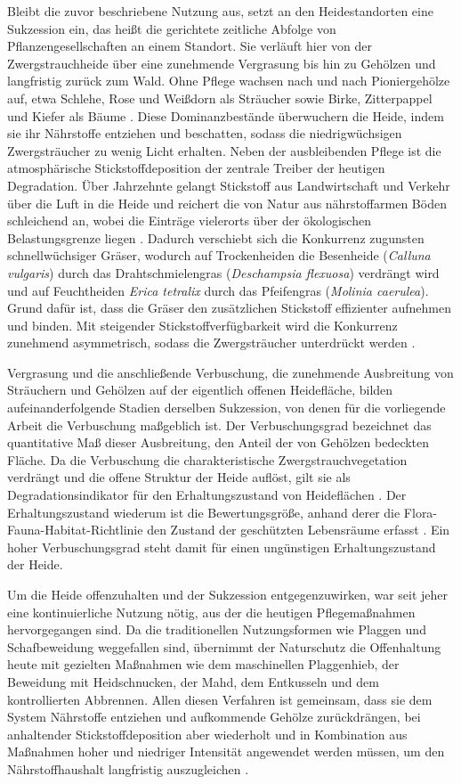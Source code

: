 Bleibt die zuvor beschriebene Nutzung aus, setzt an den Heidestandorten eine Sukzession ein, das heißt die gerichtete zeitliche Abfolge von Pflanzengesellschaften an einem Standort. Sie verläuft hier von der Zwergstrauchheide über eine zunehmende Vergrasung bis hin zu Gehölzen und langfristig zurück zum Wald. Ohne Pflege wachsen nach und nach Pioniergehölze auf, etwa Schlehe, Rose und Weißdorn als Sträucher sowie Birke, Zitterpappel und Kiefer als Bäume \cite{Schoknecht.1998}. Diese Dominanzbestände überwuchern die Heide, indem sie ihr Nährstoffe entziehen und beschatten, sodass die niedrigwüchsigen Zwergsträucher zu wenig Licht erhalten. Neben der ausbleibenden Pflege ist die atmosphärische Stickstoffdeposition der zentrale Treiber der heutigen Degradation. Über Jahrzehnte gelangt Stickstoff aus Landwirtschaft und Verkehr über die Luft in die Heide und reichert die von Natur aus nährstoffarmen Böden schleichend an, wobei die Einträge vielerorts über der ökologischen Belastungsgrenze liegen \cite{Bobbink.2010}. Dadurch verschiebt sich die Konkurrenz zugunsten schnellwüchsiger Gräser, wodurch auf Trockenheiden die Besenheide (\textit{Calluna vulgaris}) durch das Drahtschmielengras (\textit{Deschampsia flexuosa}) verdrängt wird und auf Feuchtheiden \textit{Erica tetralix} durch das Pfeifengras (\textit{Molinia caerulea}). Grund dafür ist, dass die Gräser den zusätzlichen Stickstoff effizienter aufnehmen und binden. Mit steigender Stickstoffverfügbarkeit wird die Konkurrenz zunehmend asymmetrisch, sodass die Zwergsträucher unterdrückt werden \cite{Friedrich.2011}. 

Vergrasung und die anschließende Verbuschung, die zunehmende Ausbreitung von Sträuchern und Gehölzen auf der eigentlich offenen Heidefläche, bilden aufeinanderfolgende Stadien derselben Sukzession, von denen für die vorliegende Arbeit die Verbuschung maßgeblich ist. Der Verbuschungsgrad bezeichnet das quantitative Maß dieser Ausbreitung, den Anteil der von Gehölzen bedeckten Fläche. Da die Verbuschung die charakteristische Zwergstrauchvegetation verdrängt und die offene Struktur der Heide auflöst, gilt sie als Degradationsindikator für den Erhaltungszustand von Heideflächen \cite{Schmidt.2017}. Der Erhaltungszustand wiederum ist die Bewertungsgröße, anhand derer die Flora-Fauna-Habitat-Richtlinie den Zustand der geschützten Lebensräume erfasst \cite{RatEG.1992}. Ein hoher Verbuschungsgrad steht damit für einen ungünstigen Erhaltungszustand der Heide.

Um die Heide offenzuhalten und der Sukzession entgegenzuwirken, war seit jeher eine kontinuierliche Nutzung nötig, aus der die heutigen Pflegemaßnahmen hervorgegangen sind. Da die traditionellen Nutzungsformen wie Plaggen und Schafbeweidung weggefallen sind, übernimmt der Naturschutz die Offenhaltung heute mit gezielten Maßnahmen wie dem maschinellen Plaggenhieb, der Beweidung mit Heidschnucken, der Mahd, dem Entkusseln und dem kontrollierten Abbrennen. Allen diesen Verfahren ist gemeinsam, dass sie dem System Nährstoffe entziehen und aufkommende Gehölze zurückdrängen, bei anhaltender Stickstoffdeposition aber wiederholt und in Kombination aus Maßnahmen hoher und niedriger Intensität angewendet werden müssen, um den Nährstoffhaushalt langfristig auszugleichen \cite{Haerdtle.2009}.

